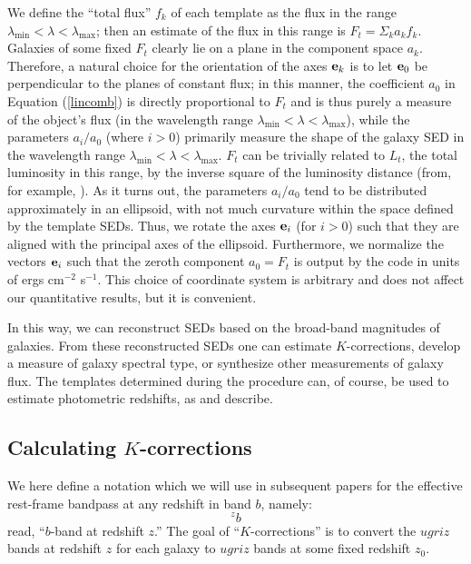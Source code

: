 \documentclass[10pt,preprint]{aastex}
\newcommand{\vv}[1]{{\bf #1}}
\newcommand{\band}[2]{\ensuremath{^{#1}\!{#2}}}
\begin{document}
We define the ``total flux'' $f_k$ of each template as the flux in the
range $\lambda_{\mathrm{min}}<\lambda<\lambda_{\mathrm{max}}$; then an
estimate of the flux in this range is $F_{{t}}=\Sigma_k a_k f_k$.
Galaxies of some fixed $F_t$ clearly lie on a plane in the component
space $a_k$. Therefore, a natural choice for the orientation of the
axes $\vv{e}_k$ is to let $\vv{e}_0$ be perpendicular to the planes of
constant flux; in this manner, the coefficient $a_0$ in Equation
(\ref{lincomb}) is directly proportional to $F_t$ and is thus purely a
measure of the object's flux (in the wavelength range
$\lambda_{\mathrm{min}} <\lambda < \lambda_{\mathrm{max}}$), while the
parameters $a_i/a_0$ (where $i>0$) primarily measure the shape of the
galaxy SED in the wavelength range $\lambda_{\mathrm{min}} <\lambda <
\lambda_{\mathrm{max}}$. $F_t$ can be trivially related to $L_t$, the
total luminosity in this range, by the inverse square of the
luminosity distance (from, for example, \citealt{hogg99a}).  As it
turns out, the parameters $a_i/a_0$ tend to be distributed
approximately in an ellipsoid, with not much curvature within the
space defined by the template SEDs. Thus, we rotate the axes
$\vv{e}_i$ (for $i>0$) such that they are aligned with the principal
axes of the ellipsoid. Furthermore, we normalize the vectors
$\vv{e}_i$ such that the zeroth component $a_0=F_t$ is output by the
code in units of ergs cm$^{-2}$ s$^{-1}$. This choice of coordinate
system is arbitrary and does not affect our quantitative results, but
it is convenient.

In this way, we can reconstruct SEDs based on the broad-band
magnitudes of galaxies. From these reconstructed SEDs one can estimate
$K$-corrections, develop a measure of galaxy spectral type, or
synthesize other measurements of galaxy flux.  The templates
determined during the procedure can, of course, be used to estimate
photometric redshifts, as \citet{csabai00a} and \citet{budavari00a}
describe.

\subsection{Calculating $K$-corrections}

We here define a notation which we will use in subsequent papers for
the effective rest-frame bandpass at any redshift in band $b$, namely:
\begin{equation}
\band{z}{b}
\end{equation}
read, ``$b$-band at redshift $z$.'' The goal of ``$K$-corrections'' is
to convert the $ugriz$ bands at redshift $z$ for each galaxy to
$ugriz$ bands at some fixed redshift $z_0$.
\end{document}
